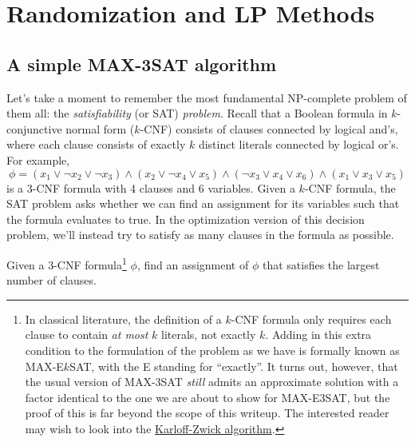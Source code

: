 \documentclass{article}
\newenvironment{envsection}[1]{\begin{trivlist}
\item[\hskip \labelsep {\bfseries #1}]}{\end{trivlist}}
\begin{document}
\section{Randomization and LP Methods}

\subsection{A simple MAX-3SAT algorithm}

Let's take a moment to remember the most fundamental NP-complete problem of them all: the \textit{satisfiability} (or SAT) \textit{problem}. Recall that a Boolean formula in $k$-conjunctive normal form ($k$-CNF) consists of clauses connected by logical and's, where each clause consists of exactly $k$ distinct literals connected by logical or's. For example,
\[
\phi = (x_1 \lor \neg x_2 \lor \neg x_3) \land (x_2 \lor \neg x_4 \lor x_5) \land (\neg x_3 \lor x_4 \lor x_6) \land (x_1 \lor x_3 \lor x_5)
\]
is a 3-CNF formula with 4 clauses and 6 variables. Given a $k$-CNF formula, the SAT problem asks whether we can find an assignment for its variables such that the formula evaluates to true. In the optimization version of this decision problem, we'll instead try to satisfy as many clauses in the formula as possible.

\begin{envsection}{Optimization Problem (MAX-$3$SAT).}
    Given a 3-CNF formula\footnote{In classical literature, the definition of a $k$-CNF formula only requires each clause to contain \textit{at most} $k$ literals, not exactly $k$. Adding in this extra condition to the formulation of the problem as we have is formally known as MAX-E$k$SAT, with the E standing for ``exactly''. It turns out, however, that the usual version of MAX-3SAT \textit{still} admits an approximate solution with a factor identical to the one we are about to show for MAX-E3SAT, but the proof of this is far beyond the scope of this writeup. The interested reader may wish to look into the \href{https://www.cs.umd.edu/~gasarch/BLOGPAPERS/max3satu.pdf}{\underline{Karloff-Zwick algorithm}}.} $\phi$, find an assignment of $\phi$ that satisfies the largest number of clauses.
\end{envsection}

\newpage
\end{document}
